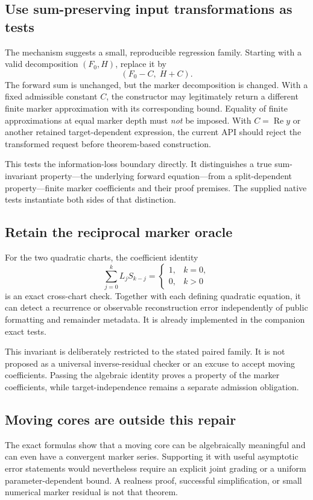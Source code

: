 \documentclass[11pt,letterpaper]{article}
\theoremstyle{remark}\newtheorem{remark}[theorem]{Remark}
\begin{document}
\subsection{Use sum-preserving input transformations as tests}
The mechanism suggests a small, reproducible regression family. Starting with
a valid decomposition $(F_0,H)$, replace it by
\begin{equation}\label{eq:metamorphic}
 (F_0-C,\;H+C).
\end{equation}
The forward sum is unchanged, but the marker decomposition is changed. With a
fixed admissible constant $C$, the constructor may legitimately return a
different finite marker approximation with its corresponding bound. Equality
of finite approximations at equal marker depth must \emph{not} be imposed.
With $C=\operatorname{Re}y$ or another retained target-dependent expression,
the current API should reject the transformed request before theorem-based
construction.

This tests the information-loss boundary directly. It distinguishes a true
sum-invariant property---the underlying forward equation---from a
split-dependent property---finite marker coefficients and their proof
premises. The supplied native tests instantiate both sides of that distinction.

\subsection{Retain the reciprocal marker oracle}
For the two quadratic charts, the coefficient identity
\[
 \sum_{j=0}^k L_jS_{k-j}=\begin{cases}1,&k=0,\\0,&k>0\end{cases}
\]
is an exact cross-chart check. Together with each defining quadratic equation,
it can detect a recurrence or observable reconstruction error independently of
public formatting and remainder metadata. It is already implemented in the
companion exact tests.

This invariant is deliberately restricted to the stated paired family. It is
not proposed as a universal inverse-residual checker or an excuse to accept
moving coefficients. Passing the algebraic identity proves a property of the
marker coefficients, while target-independence remains a separate admission
obligation.

\subsection{Moving cores are outside this repair}
The exact formulas show that a moving core can be algebraically meaningful and
can even have a convergent marker series. Supporting it with useful asymptotic
error statements would nevertheless require an explicit joint grading or a
uniform parameter-dependent bound. A realness proof, successful simplification,
or small numerical marker residual is not that theorem.
\end{document}
